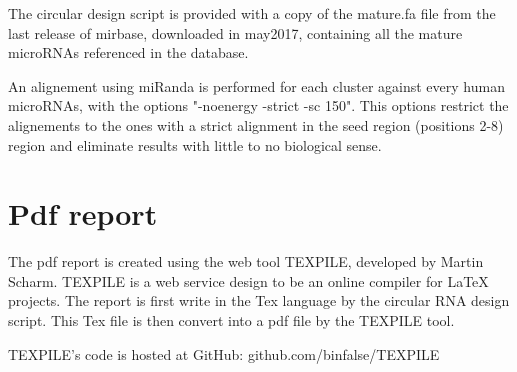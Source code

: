 \documentclass[a4paper,12pt]{report}
\begin{document}
The circular design script is provided with a copy of the mature.fa file from the last release of mirbase, downloaded in may2017, containing all the mature microRNAs referenced in the database. 

An alignement using miRanda \cite{Miranda} is performed for each cluster against every human microRNAs, with the options "-noenergy -strict -sc 150". This options restrict the alignements to the ones with a strict alignment in the seed region (positions 2-8) region and eliminate results with little to no biological sense.

\section{Pdf report}

The pdf report is created using the web tool TEXPILE, developed by Martin Scharm. TEXPILE is a web service design to be an online compiler for LaTeX projects. The report is first write in the Tex language by the circular RNA design script. This Tex file is then convert into a pdf file by the TEXPILE tool.

TEXPILE's code is hosted at GitHub: github.com/binfalse/TEXPILE




\end{document}
